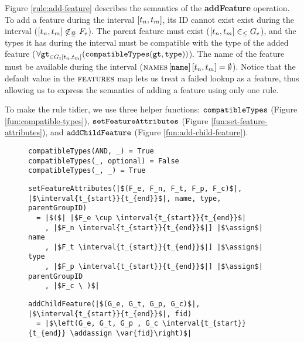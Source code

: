 Figure \vref{rule:add-feature}  describes the semantics of the \textbf{addFeature} operation. 
To add a feature during the interval $\interval{t_n}{t_m}$, its ID cannot exist exist during the interval ($\interval{t_n}{t_m} \not \innr F_e$). The parent feature must exist ($\interval{t_n}{t_m} \inn G_e$), and the types it has during the interval must be compatible with the type of the 
added feature ($\forall \var{gt}_{\in G_t\interval{t_n}{t_m}} (\var{compatibleTypes}(\var{gt}, \var{type}))$). The name of the feature must be available during the interval ($\lookup{\names{}}{\var{name}}\interval{t_n}{t_m} = \emptyset$). Notice that the default value in the $\textsc{features}{}$ map lets us treat a failed lookup as a feature, thus allowing us to express the semantics of adding a feature using only one rule. 

To make the rule tidier, we use three helper functions: $\texttt{compatibleTypes}$ (Figure \vref{fun:compatible-types}), $\texttt{setFeatureAttributes}$ (Figure \vref{fun:set-feature-attributes}), and $\texttt{addChildFeature}$ (Figure \vref{fun:add-child-feature}). 

\begin{figure}
  \begin{verbatim}
compatibleTypes(AND, _) = True
compatibleTypes(_, optional) = False
compatibleTypes(_, _) = True
  \end{verbatim}
  \caption{\label{fun:compatible-types}}
\end{figure}

\begin{figure}
  \begin{verbatim}
setFeatureAttributes(|$(F_e, F_n, F_t, F_p, F_c)$|, |$\interval{t_{start}}{t_{end}}$|, name, type, parentGroupID)
  = |$($| |$F_e \cup \interval{t_{start}}{t_{end}}$|
    , |$F_n \interval{t_{start}}{t_{end}}$|] |$\assign$| name
    , |$F_t \interval{t_{start}}{t_{end}}$|] |$\assign$| type
    , |$F_p \interval{t_{start}}{t_{end}}$|] |$\assign$| parentGroupID
    , |$F_c \ )$|
     \end{verbatim}
  \caption{\label{fun:set-feature-attributes}}
\end{figure}

\begin{figure}
  \begin{verbatim}
addChildFeature(|$(G_e, G_t, G_p, G_c)$|, |$\interval{t_{start}}{t_{end}}$|, fid)
  = |$\left(G_e, G_t, G_p , G_c \interval{t_{start}}{t_{end}} \addassign \var{fid}\right)$|
  \end{verbatim}
  \caption{\label{fun:add-child-feature}}
\end{figure}


